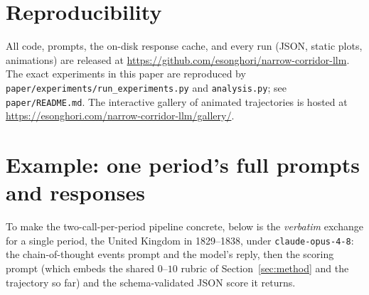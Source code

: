 \documentclass[twocolumn,10pt]{article}
\begin{document}
\section*{Reproducibility}
All code, prompts, the on-disk response cache, and every run (JSON, static
plots, animations) are released at
\url{https://github.com/esonghori/narrow-corridor-llm}. The exact
experiments in this paper are reproduced by
\texttt{paper/experiments/run\_experiments.py} and \texttt{analysis.py}; see
\texttt{paper/README.md}. The interactive gallery of animated trajectories is
hosted at \url{https://esonghori.com/narrow-corridor-llm/gallery/}.




\appendix
\onecolumn
\section{Example: one period's full prompts and responses}
\label{app:example}
To make the two-call-per-period pipeline concrete, below is the \emph{verbatim}
exchange for a single period, the United Kingdom in 1829--1838, under
\texttt{claude-opus-4-8}: the chain-of-thought events prompt and the model's
reply, then the scoring prompt (which embeds the shared $0$--$10$ rubric of
Section~\ref{sec:method} and the trajectory so far) and the schema-validated JSON
score it returns.


\end{document}
